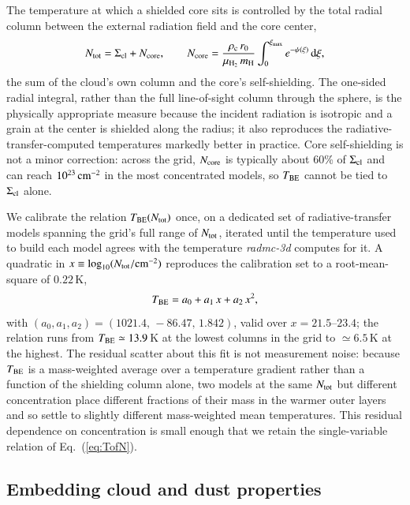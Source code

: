 \documentclass{aa}
\newcommand{\Scloud}{\Sigma_{\rm cl}}
\newcommand{\ximax}{\xi_{\rm max}}
\newcommand{\Tbe}{T_{\rm BE}}
\newcommand{\rhoc}{\rho_{\rm c}}
\newcommand{\rzero}{r_{0}}
\newcommand{\mH}{m_{\rm H}}
\newcommand{\muH}{\mu_{\rm H_2}}
\begin{document}
The temperature at which a shielded core sits is controlled by the total
radial column between the external radiation field and the core center,
\begin{equation}
  N_{\rm tot} = \Scloud + N_{\rm core},
  \qquad
  N_{\rm core} = \frac{\rhoc\,\rzero}{\muH\,\mH}
                      \int_{0}^{\ximax} e^{-\psi(\xi)}\,{\rm d}\xi ,
  \label{eq:Ntot}
\end{equation}
the sum of the cloud's own column and the core's self-shielding. The
one-sided radial integral, rather than the full line-of-sight column
through the sphere, is the physically appropriate measure because the
incident radiation is isotropic and a grain at the center is shielded along
the radius; it also reproduces the radiative-transfer-computed temperatures markedly
better in practice. Core self-shielding is not a minor correction: across
the grid, $N_{\rm core}$ is typically about 60\% of $\Scloud$ and can
reach $10^{23}\,{\rm cm^{-2}}$ in the most concentrated models, so
$\Tbe$ cannot be tied to $\Scloud$ alone.

We calibrate the relation $\Tbe(N_{\rm tot})$ once, on a dedicated set
of radiative-transfer models spanning the grid's full range of $N_{\rm tot}$, iterated
until the temperature used to build each model agrees with the temperature
\emph{radmc-3d} computes for it. A quadratic in
$x \equiv \log_{10}(N_{\rm tot}/{\rm cm^{-2}})$ reproduces the
calibration set to a root-mean-square of $0.22$\,K,
\begin{equation}
  \Tbe = a_0 + a_1\,x + a_2\,x^2,
  \label{eq:TofN}
\end{equation}
with $(a_0,a_1,a_2) = (1021.4,\,-86.47,\,1.842)$, valid over
$x = 21.5$--$23.4$; the relation runs from $\Tbe \simeq 13.9$\,K at the
lowest columns in the grid to $\simeq 6.5$\,K at the highest. The residual
scatter about this fit is not measurement noise: because $\Tbe$ is a
mass-weighted average over a temperature gradient rather than a function of
the shielding column alone, two models at the same $N_{\rm tot}$ but
different concentration place different fractions of their mass in the
warmer outer layers and so settle to slightly different mass-weighted mean
temperatures. This residual dependence on concentration is small enough
that we retain the single-variable relation of Eq.~(\ref{eq:TofN}).

\subsection{Embedding cloud and dust properties}
\label{sec:cloud}
\end{document}
